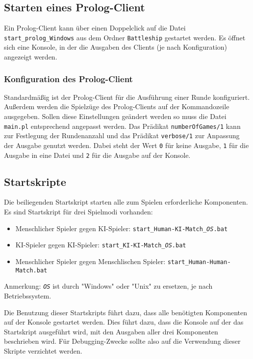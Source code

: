\subsection{Starten eines Prolog-Client}
	Ein Prolog-Client kann über einen Doppelclick auf die Datei \texttt{start\_prolog\_Windows} aus dem Ordner 
	\texttt{Battleship} 
	gestartet werden. Es öffnet sich eine Konsole, in der die Ausgaben des Clients (je nach Konfiguration) angezeigt werden.
	
	\subsubsection {Konfiguration des Prolog-Client}
		Standardmäßig ist der Prolog-Client für die Ausführung einer Runde konfiguriert. Außerdem werden die Spielzüge des Prolog-Clients auf
		der Kommandozeile ausgegeben. Sollen diese Einstellungen geändert werden so muss die Datei \texttt{main.pl} entsprechend angepasst werden.
		Das Prädikat \texttt{numberOfGames/1} kann zur Festlegung der Rundenanzahl und das Prädikat \texttt{verbose/1} zur Anpassung der Ausgabe 
		genutzt werden. Dabei steht der Wert \texttt{0} für keine Ausgabe, \texttt{1} für die Ausgabe in eine Datei und \texttt{2} für 
		die Ausgabe auf der Konsole.
\subsection{Startskripte} %
\label{sub:startskripte}
	Die beiliegenden Startskript starten alle zum Spielen erforderliche Komponenten. Es sind Startskript für drei Spielmodi vorhanden:
	\begin{itemize}
		\item Menschlicher Spieler gegen KI-Spieler: \texttt{start\_Human-KI-Match\_\emph{OS}.bat}
		\item KI-Spieler gegen KI-Spieler: \texttt{start\_KI-KI-Match\_\emph{OS}.bat}
		\item Menschlicher Spieler gegen Menschlischen Spieler: \texttt{start\_Human-Human-Match.bat}
	\end{itemize}
	Anmerkung: \texttt{\emph{OS}} ist durch "Windows" oder "Unix" zu ersetzen, je nach Betriebssystem.
	
	Die Benutzung dieser Startskripts führt dazu, dass alle benötigten Komponenten auf der Konsole gestartet werden. Dies führt dazu, dass die Konsole 
	auf der das Startskript ausgeführt wird, mit den Ausgaben aller drei Komponenten beschrieben wird. Für Debugging-Zwecke sollte also auf die Verwendung dieser 
	Skripte verzichtet werden.
